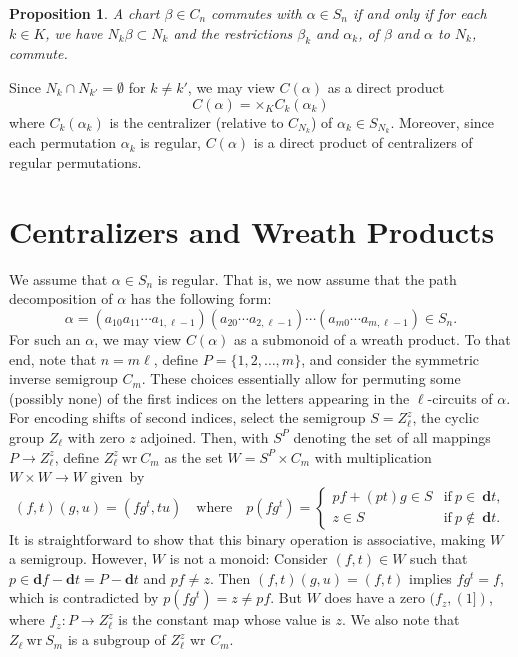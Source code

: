 \documentclass{surv-l}
\numberwithin{equation}{section}
\numberwithin{table}{section}
\numberwithin{figure}{section}
\newtheorem{proposition}[equation]{Proposition}
\theoremstyle{definition}
\begin{document}
\begin{proposition}\label{prop4.13.2}
A chart $\beta\in C_{n}$ commutes with $\alpha\in S_{n}$ if and
only if for each $k\in K$, we have $N_{k}\beta\subset N_{k}$ and
the restrictions $\beta_{k}$ and $\alpha_{k}$, of $\beta$  and
$\alpha$ to $N_{k}$, commute.
\end{proposition}

Since $N_{k}\cap N_{k'}=\emptyset$ for $k\neq k'$, we may view
$C(\alpha)$ as a direct product
\[
C(\alpha)=\times {}_{K}C_{k}(\alpha_{k})
\]
where $C_{k}(\alpha_{k})$ is the centralizer (relative to
$C_{N_{k}}$) of $\alpha_{k}\in S_{N_{k}}$. Moreover, since each
permutation $\alpha_{k}$ is regular, $C(\alpha)$ is a direct
product of centralizers of regular permutations.

\section{Centralizers and Wreath Products}\label{sec4.14}

We assume that $\alpha\in S_{n}$ is regular. That is, we now
assume that the path decomposition of $\alpha$ has the
following form:
\[
\alpha=(a_{10}a_{11}\cdots a_{1,\ell-1})(a_{20}\cdots a_{2,\ell-1})
\cdots(a_{m0}\cdots a_{m,\ell-1})\in S_{n}.
\]
For such an $\alpha$, we may view $C(\alpha)$ as a submonoid of a
wreath product. To that end, note that $n =m\ell$, define
$P=\{1,2,\ldots,m\}$, and consider the symmetric inverse semigroup
$C_{m}$. These choices essentially allow for permuting some
(possibly none) of the first indices on the letters appearing in
the $\ell$-circuits of $\alpha$. For encoding shifts of second
indices, select the semigroup $S =Z_{\ell}^{z}$, the cyclic group
$Z_{\ell}$ with zero $z$ adjoined. Then, with $S^{P}$ denoting the
set of all mappings $P\rightarrow Z_{\ell}^{z}$, define
$Z_{\ell}^{z}\  \mathrm{wr} \ C_{m}$ as the set $W=S^{P}\times
C_{m}$ with multiplication $W\times W\rightarrow W$ given~by
\[
(f,t)(g,u) =(fg^{t},tu)\quad \mathrm{where}\quad
p(fg^{t})=\begin{cases}
pf+(pt)g\in S &\mathrm{if}\ p\in\ \mathbf{d}t,\\
z\in S &\mathrm{if}\ p\not\in\ \mathbf{d}t.
\end{cases}
\]
It is straightforward to show that this binary operation is
associative, making $W$ a semigroup. However, $W$ is not a monoid:
Consider $(f,t)\in W$ such that $p\in \mathbf{d}f- \textbf{d}t =
P-\textbf{d}t$ and $pf\neq z$. Then $(f,t)(g,u)=(f,t)$ implies
$fg^{t}=f$, which is contradicted by $p(fg^{t})=z\neq pf$. But $W$
does have a zero $(f_{z},(1])$, where $f_{z} : P\rightarrow
Z_{\ell}^{z}$ is the constant map whose value is $z$. We also note
that $Z_{\ell}\  \mathrm{wr} \ S_{m}$ is a subgroup of
$Z_{\ell}^{z}$ wr $C_{m}$.
\end{document}

